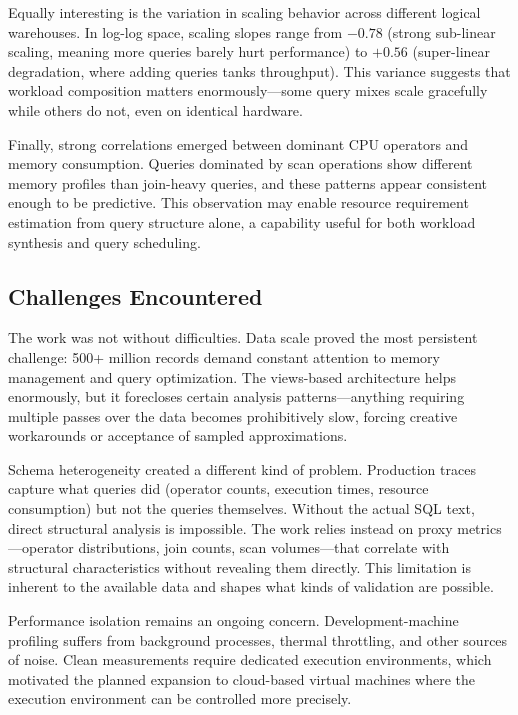 \documentclass[12pt]{report}
\begin{document}
Equally interesting is the variation in scaling behavior across different logical warehouses. In log-log space, scaling slopes range from $-0.78$ (strong sub-linear scaling, meaning more queries barely hurt performance) to $+0.56$ (super-linear degradation, where adding queries tanks throughput). This variance suggests that workload composition matters enormously---some query mixes scale gracefully while others do not, even on identical hardware.

Finally, strong correlations emerged between dominant CPU operators and memory consumption. Queries dominated by scan operations show different memory profiles than join-heavy queries, and these patterns appear consistent enough to be predictive. This observation may enable resource requirement estimation from query structure alone, a capability useful for both workload synthesis and query scheduling.

\subsection{Challenges Encountered}
\label{subsec:challenges}

The work was not without difficulties. Data scale proved the most persistent challenge: 500+ million records demand constant attention to memory management and query optimization. The views-based architecture helps enormously, but it forecloses certain analysis patterns---anything requiring multiple passes over the data becomes prohibitively slow, forcing creative workarounds or acceptance of sampled approximations.

Schema heterogeneity created a different kind of problem. Production traces capture what queries did (operator counts, execution times, resource consumption) but not the queries themselves. Without the actual SQL text, direct structural analysis is impossible. The work relies instead on proxy metrics---operator distributions, join counts, scan volumes---that correlate with structural characteristics without revealing them directly. This limitation is inherent to the available data and shapes what kinds of validation are possible.

Performance isolation remains an ongoing concern. Development-machine profiling suffers from background processes, thermal throttling, and other sources of noise. Clean measurements require dedicated execution environments, which motivated the planned expansion to cloud-based virtual machines where the execution environment can be controlled more precisely.
\end{document}
